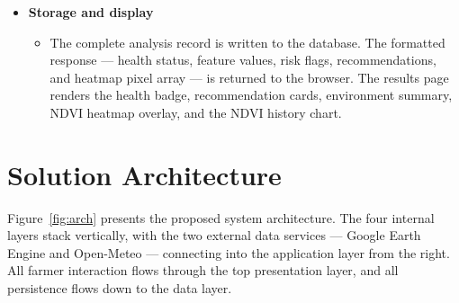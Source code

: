 \begin{itemize}
  \item \textbf{Storage and display}
    \begin{itemize}
      \item[-] The complete analysis record is written to the database. The formatted response — health status, feature values, risk flags, recommendations, and heatmap pixel array — is returned to the browser. The results page renders the health badge, recommendation cards, environment summary, NDVI heatmap overlay, and the NDVI history chart.
    \end{itemize}
\end{itemize}

\section{Solution Architecture}

Figure~\ref{fig:arch} presents the proposed system architecture. The four internal layers stack vertically, with the two external data services — Google Earth Engine and Open-Meteo — connecting into the application layer from the right. All farmer interaction flows through the top presentation layer, and all persistence flows down to the data layer.

